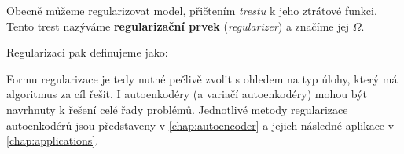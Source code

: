 Obecně můžeme regularizovat model, přičtením \emph{trestu} k jeho ztrátové funkci. Tento trest nazýváme \textbf{regularizační prvek} (\emph{regularizer}) a značíme jej $\Omega$.

Regularizaci pak definujeme jako:
\begin{displayquote}
     \cite{Goodfellow2016}
\end{displayquote}

Formu regularizace je tedy nutné pečlivě zvolit s ohledem na typ úlohy, který má algoritmus za cíl řešit.
I autoenkodéry (a variačí autoenkodéry) mohou být navrhnuty k řešení celé řady problémů. Jednotlivé metody regularizace autoenkodérů jsou představeny v \autoref{chap:autoencoder} a jejich následné aplikace v \autoref{chap:applications}.





